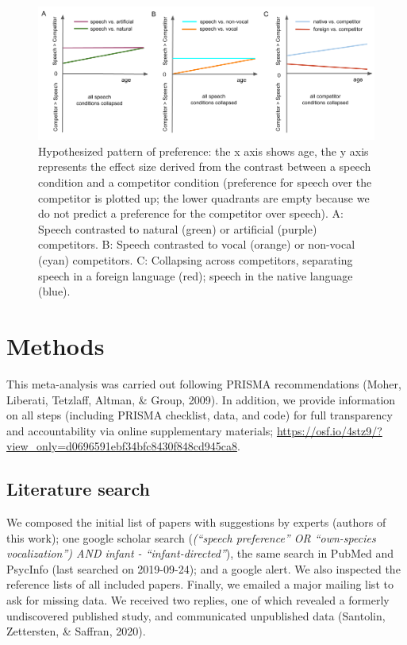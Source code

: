 \documentclass[
  man]{apa6}
\begin{document}
\begin{figure}
\centering
\includegraphics{figures_intro/hypotheses.png}
\caption{\label{fig:hyp}Hypothesized pattern of preference: the x axis shows age, the y axis represents the effect size derived from the contrast between a speech condition and a competitor condition (preference for speech over the competitor is plotted up; the lower quadrants are empty because we do not predict a preference for the competitor over speech). A: Speech contrasted to natural (green) or artificial (purple) competitors. B: Speech contrasted to vocal (orange) or non-vocal (cyan) competitors. C: Collapsing across competitors, separating speech in a foreign language (red); speech in the native language (blue).}
\end{figure}

\hypertarget{methods}{%
\section{Methods}\label{methods}}

This meta-analysis was carried out following PRISMA recommendations (Moher, Liberati, Tetzlaff, Altman, \& Group, 2009). In addition, we provide information on all steps (including PRISMA checklist, data, and code) for full transparency and accountability via online supplementary materials; \url{https://osf.io/4stz9/?view_only=d0696591ebf34bfc8430f848cd945ca8}.

\hypertarget{literature-search}{%
\subsection{Literature search}\label{literature-search}}

We composed the initial list of papers with suggestions by experts (authors of this work); one google scholar search (\emph{(\enquote{speech preference} OR \enquote{own-species vocalization}) AND infant - \enquote{infant-directed}}), the same search in PubMed and PsycInfo (last searched on 2019-09-24); and a google alert. We also inspected the reference lists of all included papers. Finally, we emailed a major mailing list to ask for missing data. We received two replies, one of which revealed a formerly undiscovered published study, and communicated unpublished data (Santolin, Zettersten, \& Saffran, 2020).
\end{document}
